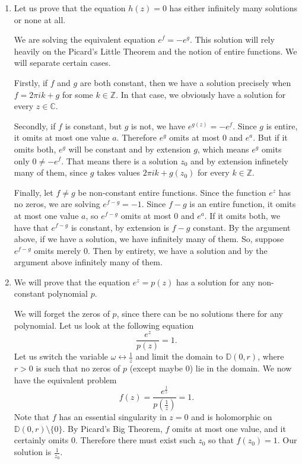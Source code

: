 \documentclass[a4paper, 12pt]{article} %
\newcommand{\D}{\mathbb{D}}
\newcommand{\Z}{\mathbb{Z}}
\newcommand{\C}{\mathbb{C}}
\begin{document}
\begin{enumerate}[label=(\alph*)]
	\item Let us prove that the equation $h(z) = 0$ has either infinitely many solutions or none at all.
	
	We are solving the equivalent equation $e^f = -e^g$. This solution will rely heavily on the Picard's Little Theorem and the notion of entire functions. We will separate certain cases.
	
	Firstly, if $f$ and $g$ are both constant, then we have a solution precisely when $f = 2\pi i k + g$ for some $k \in \Z$. In that case, we obviously have a solution for every $z \in \C$.
	
	Secondly, if $f$ is constant, but $g$ is not, we have $e^{g(z)} = -e^f$. Since $g$ is entire, it omits at most one value $a$. Therefore $e^g$ omits at most $0$ and $e^a$. But if it omits both, $e^g$ will be constant and by extension $g$, which means $e^g$ omits only $0 \neq -e^f$. That means there is a solution $z_0$ and by extension infinetely many of them, since $g$ takes values $2\pi i k + g(z_0)$ for every $k \in \Z$.
	
	Finally, let $f \neq g$ be non-constant entire functions. Since the function $e^z$ has no zeros, we are solving $e^{f-g} = -1$. Since $f-g$ is an entire function, it omits at most one value $a$, so $e^{f-g}$ omits at most $0$ and $e^a$. If it omits both, we have that $e^{f-g}$ is constant, by extension is $f-g$ constant. By the argument above, if we have a solution, we have infinitely many of them. So, suppose $e^{f-g}$ omits merely $0$. Then by entirety, we have a solution and by the argument above infinitely many of them.
	
	\item We will prove that the equation $e^z = p(z)$ has a solution for any non-constant polynomial $p$.
	
	We will forget the zeros of $p$, since there can be no solutions there for any polynomial. Let us look at the following equation
	\[
	\frac{e^z}{p(z)} = 1.
	\]
	Let us switch the variable $\omega \longleftrightarrow \frac{1}{z}$ and limit the domain to $\D(0, r)$, where $r > 0$ is such that no zeros of $p$ (except maybe $0$) lie in the domain.
	We now have the equivalent problem
	\[
	f(z) = \frac{e^{\frac{1}{z}}}{p(\frac{1}{z})} = 1.
	\]
	Note that $f$ has an essential singularity in $z = 0$ and is holomorphic on $\D(0, r)\setminus\lbrace 0 \rbrace$. By Picard's Big Theorem, $f$ omits at most one value, and it certainly omits $0$. Therefore there must exist such $z_0$ so that $f(z_0) = 1$. Our solution is $\frac{1}{z_0}$.
\end{enumerate}
\end{document}
